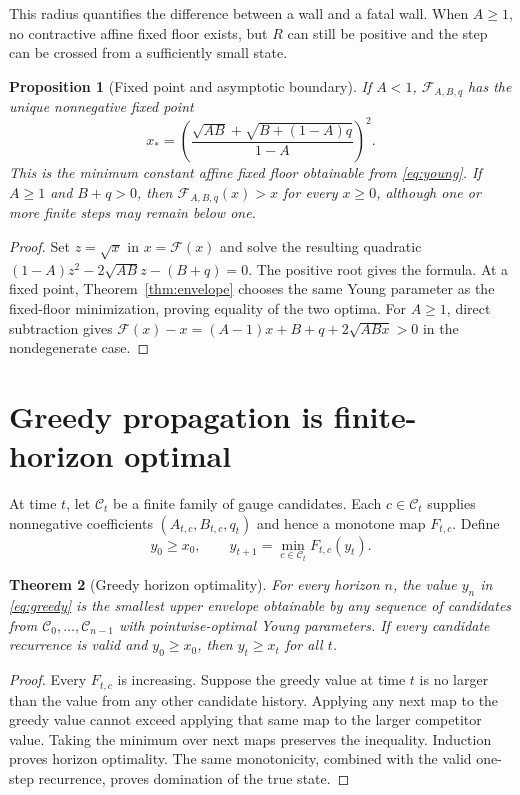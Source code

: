 \documentclass[12pt]{article}
\newtheorem{theorem}{Theorem}
\newtheorem{proposition}[theorem]{Proposition}
\begin{document}
This radius quantifies the difference between a wall and a fatal wall.  When
$A\geq1$, no contractive affine fixed floor exists, but $R$ can still be
positive and the step can be crossed from a sufficiently small state.

\begin{proposition}[Fixed point and asymptotic boundary]\label{prop:fixed}
If $A<1$, $\mathcal F_{A,B,q}$ has the unique nonnegative fixed point
\[
 x_*=\left(
 \frac{\sqrt{AB}+\sqrt{B+(1-A)q}}{1-A}
 \right)^2.
\]
This is the minimum constant affine fixed floor obtainable from
\eqref{eq:young}.  If $A\geq1$ and $B+q>0$, then
$\mathcal F_{A,B,q}(x)>x$ for every $x\geq0$, although one or more finite
steps may remain below one.
\end{proposition}

\begin{proof}
Set $z=\sqrt{x}$ in $x=\mathcal F(x)$ and solve the resulting quadratic
$(1-A)z^2-2\sqrt{AB}z-(B+q)=0$.  The positive root gives the formula.  At a
fixed point, Theorem~\ref{thm:envelope} chooses the same Young parameter as
the fixed-floor minimization, proving equality of the two optima.  For
$A\geq1$, direct subtraction gives
$\mathcal F(x)-x=(A-1)x+B+q+2\sqrt{ABx}>0$ in the nondegenerate case.
\end{proof}

\section{Greedy propagation is finite-horizon optimal}
At time $t$, let $\mathcal C_t$ be a finite family of gauge candidates.  Each
$c\in\mathcal C_t$ supplies nonnegative coefficients
$(A_{t,c},B_{t,c},q_t)$ and hence a monotone map $F_{t,c}$.  Define
\begin{equation}\label{eq:greedy}
 y_0\geq x_0,
 \qquad
 y_{t+1}=\min_{c\in\mathcal C_t}F_{t,c}(y_t).
\end{equation}

\begin{theorem}[Greedy horizon optimality]\label{thm:greedy}
For every horizon $n$, the value $y_n$ in \eqref{eq:greedy} is the smallest
upper envelope obtainable by any sequence of candidates from
$\mathcal C_0,\ldots,\mathcal C_{n-1}$ with pointwise-optimal Young
parameters.  If every candidate recurrence is valid and $y_0\geq x_0$, then
$y_t\geq x_t$ for all $t$.
\end{theorem}

\begin{proof}
Every $F_{t,c}$ is increasing.  Suppose the greedy value at time $t$ is no
larger than the value from any other candidate history.  Applying any next
map to the greedy value cannot exceed applying that same map to the larger
competitor value.  Taking the minimum over next maps preserves the
inequality.  Induction proves horizon optimality.  The same monotonicity,
combined with the valid one-step recurrence, proves domination of the true
state.
\end{proof}
\end{document}
